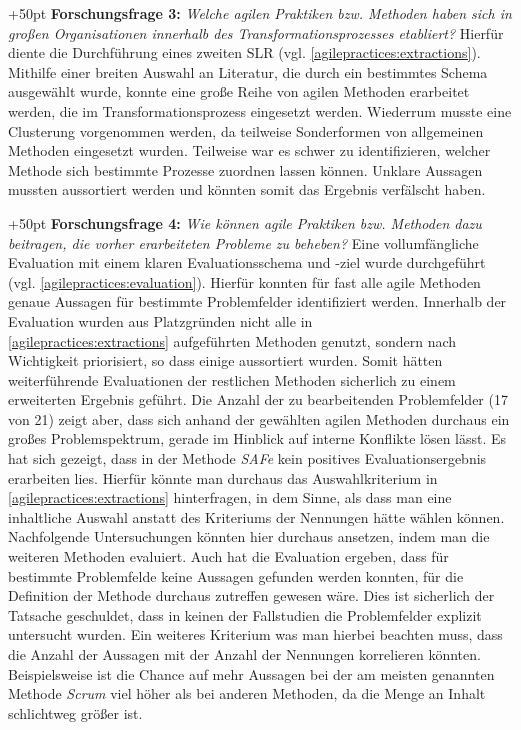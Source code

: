 \hangindent+50pt 
\textbf{Forschungsfrage 3:} \textit{Welche agilen Praktiken bzw. Methoden haben sich in großen Organisationen innerhalb des Transformationsprozesses etabliert?
} Hierfür diente die Durchführung eines zweiten SLR (vgl. \ref{agilepractices:extractions}). Mithilfe einer breiten Auswahl an Literatur, die durch ein bestimmtes Schema ausgewählt wurde, konnte eine große Reihe von agilen Methoden erarbeitet werden, die im Transformationsprozess eingesetzt werden. Wiederrum musste eine Clusterung vorgenommen werden, da teilweise Sonderformen von allgemeinen Methoden eingesetzt wurden. Teilweise war es schwer zu identifizieren, welcher Methode sich bestimmte Prozesse zuordnen lassen können. Unklare Aussagen mussten aussortiert werden und könnten somit das Ergebnis verfälscht haben.

\hangindent+50pt 
\textbf{Forschungsfrage 4:} \textit{Wie können agile Praktiken bzw. Methoden dazu beitragen, die vorher erarbeiteten Probleme zu beheben?} Eine vollumfängliche Evaluation mit einem klaren Evaluationsschema und -ziel wurde durchgeführt (vgl. \ref{agilepractices:evaluation}). Hierfür konnten für fast alle agile Methoden genaue Aussagen für bestimmte Problemfelder identifiziert werden. Innerhalb der Evaluation wurden aus Platzgründen nicht alle in \\ \ref{agilepractices:extractions} aufgeführten Methoden genutzt, sondern nach Wichtigkeit priorisiert, so dass einige aussortiert wurden. Somit hätten weiterführende Evaluationen der restlichen Methoden sicherlich zu einem erweiterten Ergebnis geführt. Die Anzahl der zu bearbeitenden Problemfelder (17 von 21) zeigt aber, dass sich anhand der gewählten agilen Methoden durchaus ein großes Problemspektrum, gerade im Hinblick auf interne Konflikte lösen lässt. Es hat sich gezeigt, dass in der Methode \textit{SAFe} kein positives Evaluationsergebnis erarbeiten lies. Hierfür könnte man durchaus das Auswahlkriterium in \ref{agilepractices:extractions} hinterfragen, in dem Sinne, als dass man eine inhaltliche Auswahl anstatt des Kriteriums der Nennungen hätte wählen können. Nachfolgende Untersuchungen könnten hier durchaus ansetzen, indem man die weiteren Methoden evaluiert. Auch hat die Evaluation ergeben, dass für bestimmte Problemfelde keine Aussagen gefunden werden konnten, für die Definition der Methode durchaus zutreffen gewesen wäre. Dies ist sicherlich der Tatsache geschuldet, dass in keinen der Fallstudien die Problemfelder explizit untersucht wurden. Ein weiteres Kriterium was man hierbei beachten muss, dass die Anzahl der Aussagen mit der Anzahl der Nennungen korrelieren könnten. Beispielsweise ist die Chance auf mehr Aussagen bei der am meisten genannten Methode  \textit{Scrum} viel höher als bei anderen Methoden, da die Menge an Inhalt schlichtweg größer ist. 

